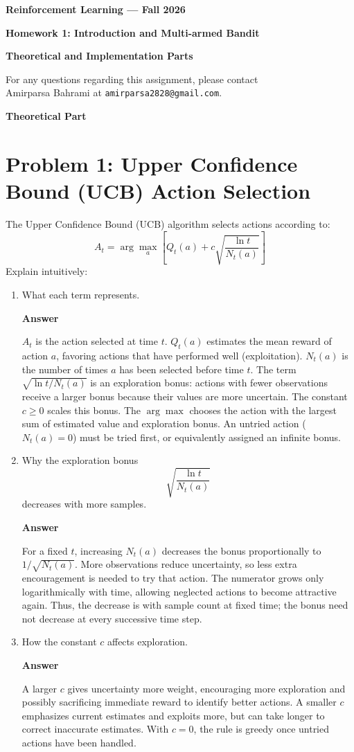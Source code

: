 \documentclass[11pt,a4paper]{article}
\newcommand{\answer}{\par\smallskip\textbf{Answer}\par}
\begin{document}
\begin{center}
{\Large\bfseries Reinforcement Learning --- Fall 2026\par}
\vspace{10pt}
{\LARGE\bfseries Homework 1: Introduction and Multi-armed Bandit\par}
\vspace{10pt}
{\large\bfseries\color{blue} Theoretical and Implementation Parts\par}
\vspace{10pt}
For any questions regarding this assignment, please contact\\
Amirparsa Bahrami at \texttt{amirparsa2828@gmail.com}.
\end{center}
\vspace{8pt}
{\large\bfseries\color{blue} Theoretical Part}
\section{Problem 1: Upper Confidence Bound (UCB) Action Selection}
The Upper Confidence Bound (UCB) algorithm selects actions according to:
\[
A_t=\arg\max_a\left[Q_t(a)+c\sqrt{\frac{\ln t}{N_t(a)}}\right]
\]
Explain intuitively:
\begin{enumerate}
\item What each term represents.
\answer
$A_t$ is the action selected at time $t$. $Q_t(a)$ estimates the mean reward of action $a$, favoring actions that have performed well (exploitation). $N_t(a)$ is the number of times $a$ has been selected before time $t$. The term $\sqrt{\ln t/N_t(a)}$ is an exploration bonus: actions with fewer observations receive a larger bonus because their values are more uncertain. The constant $c\geq0$ scales this bonus. The $\arg\max$ chooses the action with the largest sum of estimated value and exploration bonus. An untried action ($N_t(a)=0$) must be tried first, or equivalently assigned an infinite bonus.

\item Why the exploration bonus
\[
\sqrt{\frac{\ln t}{N_t(a)}}
\]
decreases with more samples.
\answer
For a fixed $t$, increasing $N_t(a)$ decreases the bonus proportionally to $1/\sqrt{N_t(a)}$. More observations reduce uncertainty, so less extra encouragement is needed to try that action. The numerator grows only logarithmically with time, allowing neglected actions to become attractive again. Thus, the decrease is with sample count at fixed time; the bonus need not decrease at every successive time step.

\item How the constant $c$ affects exploration.
\answer
A larger $c$ gives uncertainty more weight, encouraging more exploration and possibly sacrificing immediate reward to identify better actions. A smaller $c$ emphasizes current estimates and exploits more, but can take longer to correct inaccurate estimates. With $c=0$, the rule is greedy once untried actions have been handled.
\end{enumerate}
\end{document}
